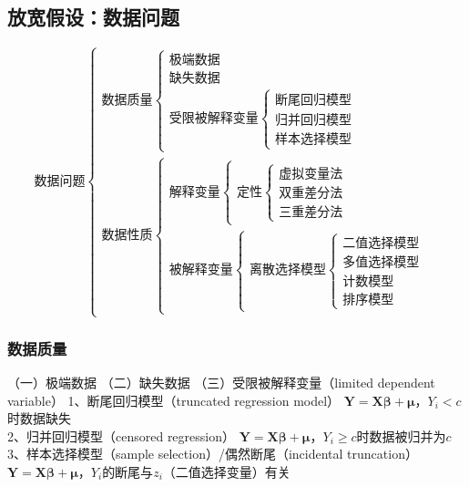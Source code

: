 \documentclass[12pt]{book}
\begin{document}
\subsection{放宽假设：数据问题}






\begin{equation*} 
    数据问题\begin{cases} 数据质量\begin{cases} 极端数据\\ 缺失数据\\ 受限被解释变量
        \begin{cases} 断尾回归模型\\ 归并回归模型\\ 样本选择模型 \end{cases} 
    \end{cases}\\ 数据性质\begin{cases} 解释变量\begin{cases} 定性
        \begin{cases} 虚拟变量法\\ 双重差分法\\ 三重差分法 \end{cases} 
    \end{cases}\\ 被解释变量\begin{cases} 离散选择模型\begin{cases} 
        二值选择模型\\ 多值选择模型\\ 计数模型\\ 排序模型 \end{cases} 
    \end{cases} \end{cases} \end{cases} 
\end{equation*}  

\subsubsection{数据质量}
（一）极端数据
（二）缺失数据
（三）受限被解释变量（limited dependent variable）
1、断尾回归模型（truncated regression model）
$\bm{Y}=\bm{X\beta}+\bm{\mu}$，$Y_i<c$时数据缺失\\ 
2、归并回归模型（censored regression）
$\bm{Y}=\bm{X\beta}+\bm{\mu}$，$Y_i\geq c$时数据被归并为$c$\\ 
3、样本选择模型（sample selection）/偶然断尾（incidental truncation）
$\bm{Y}=\bm{X\beta}+\bm{\mu}$，$Y_i$的断尾与$z_i$（二值选择变量）有关\\ 
\end{document}
